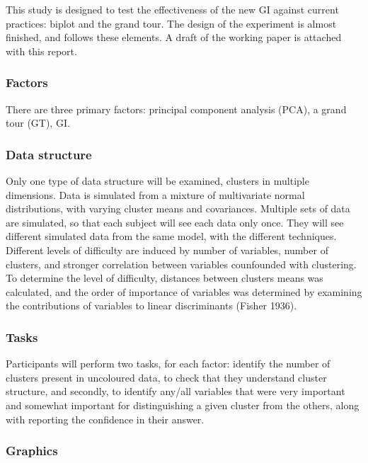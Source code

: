 \documentclass[11,]{article}
\begin{document}
This study is designed to test the effectiveness of the new GI against current practices: biplot and the grand tour. The design of the experiment is almost finished, and follows these elements. A draft of the working paper is attached with this report.

\hypertarget{sec:factors}{%
\subsubsection{Factors}\label{sec:factors}}

There are three primary factors: principal component analysis (PCA), a grand tour (GT), GI.

\hypertarget{data-structure}{%
\subsubsection{Data structure}\label{data-structure}}

Only one type of data structure will be examined, clusters in multiple dimensions. Data is simulated from a mixture of multivariate normal distributions, with varying cluster means and covariances. Multiple sets of data are simulated, so that each subject will see each data only once. They will see different simulated data from the same model, with the different techniques. Different levels of difficulty are induced by number of variables, number of clusters, and stronger correlation between variables counfounded with clustering. To determine the level of difficulty, distances between clusters means was calculated, and the order of importance of variables was determined by examining the contributions of variables to linear discriminants (Fisher 1936).

\hypertarget{sec:tasks}{%
\subsubsection{Tasks}\label{sec:tasks}}

Participants will perform two tasks, for each factor: identify the number of clusters present in uncoloured data, to check that they understand cluster structure, and secondly, to identify any/all variables that were very important and somewhat important for distinguishing a given cluster from the others, along with reporting the confidence in their answer.

\hypertarget{graphics}{%
\subsubsection{Graphics}\label{graphics}}
\end{document}
